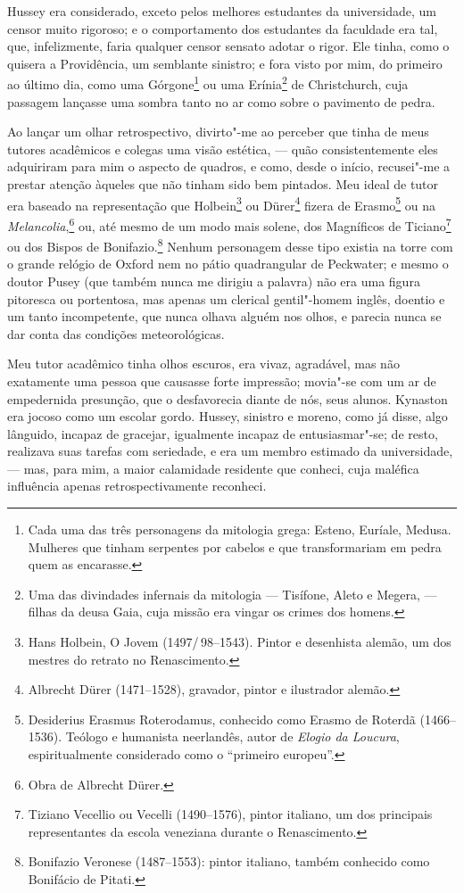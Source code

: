 Hussey era considerado, exceto pelos melhores estudantes da
universidade, um censor muito rigoroso; e o comportamento dos estudantes
da faculdade era tal, que, infelizmente, faria qualquer censor sensato
adotar o rigor. Ele tinha, como o quisera a Providência, um semblante
sinistro; e fora visto por mim, do primeiro ao último dia, como uma
Górgone\footnote{Cada uma das três personagens da mitologia grega:
  Esteno, Euríale, Medusa. Mulheres que tinham serpentes por cabelos e
  que transformariam em pedra quem as encarasse.} ou uma
Erínia\footnote{Uma das divindades infernais da mitologia --- Tisífone,
  Aleto e Megera, --- filhas da deusa Gaia, cuja missão era vingar os
  crimes dos homens.} de Christchurch, cuja passagem
lançasse uma sombra tanto no ar como sobre o pavimento de pedra.

Ao lançar um olhar retrospectivo, divirto"-me ao perceber que tinha de
meus tutores acadêmicos e colegas uma visão estética, --- quão
consistentemente eles adquiriram para mim o aspecto de quadros, e como,
desde o início, recusei"-me a prestar atenção àqueles que não tinham sido
bem pintados. Meu ideal de tutor era baseado na representação que
Holbein\footnote{Hans Holbein, O Jovem (1497/\,98--1543). Pintor e
  desenhista alemão, um dos mestres do retrato no Renascimento.} ou Dürer\footnote{Albrecht Dürer (1471--1528), gravador, pintor
  e ilustrador alemão.} fizera de Erasmo\footnote{Desiderius
  Erasmus Roterodamus, conhecido como Erasmo de Roterdã
  (1466--1536).
  Teólogo e humanista neerlandês, autor
  de \textit{Elogio da Loucura}, espiritualmente considerado como o
  ``primeiro europeu''.} ou na
\textit{Melancolia},\footnote{Obra de Albrecht Dürer.} ou, até mesmo de um modo mais solene, dos Magníficos
de Ticiano\footnote{Tiziano Vecellio ou Vecelli (1490--1576), pintor
  italiano, um dos principais representantes da escola veneziana durante
  o Renascimento.} ou dos Bispos de Bonifazio.\footnote{Bonifazio
  Veronese (1487--1553): pintor italiano, também conhecido como Bonifácio
  de Pitati.} Nenhum personagem desse tipo existia na
torre com o grande relógio de Oxford nem no pátio quadrangular de
Peckwater; e mesmo o doutor Pusey (que também nunca me dirigiu a
palavra) não era uma figura pitoresca ou portentosa, mas apenas um
clerical gentil"-homem inglês, doentio e um tanto incompetente, que nunca
olhava alguém nos olhos, e parecia nunca se dar conta das condições
meteorológicas.

Meu tutor acadêmico tinha olhos escuros, era vivaz, agradável, mas
não exatamente uma pessoa que causasse forte impressão; movia"-se com um
ar de empedernida presunção, que o desfavorecia diante de nós, seus
alunos. Kynaston era jocoso como um escolar gordo. Hussey, sinistro e
moreno, como já disse, algo lânguido, incapaz de gracejar, igualmente
incapaz de entusiasmar"-se; de resto, realizava suas tarefas com
seriedade, e era um membro estimado da universidade, --- mas, para mim, a
maior calamidade residente que conheci, cuja maléfica influência apenas
retrospectivamente reconheci.

